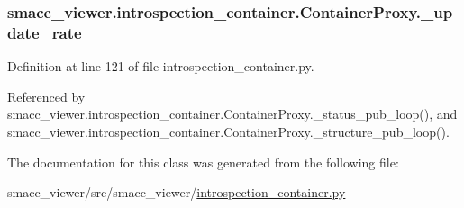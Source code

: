 \subsubsection[{\texorpdfstring{\+\_\+update\+\_\+rate}{_update_rate}}]{\setlength{\rightskip}{0pt plus 5cm}smacc\+\_\+viewer.\+introspection\+\_\+container.\+Container\+Proxy.\+\_\+update\+\_\+rate\hspace{0.3cm}{\ttfamily [private]}}\hypertarget{classsmacc__viewer_1_1introspection__container_1_1ContainerProxy_a0c5222106d95d0d78632d21873b7d2a8}{}\label{classsmacc__viewer_1_1introspection__container_1_1ContainerProxy_a0c5222106d95d0d78632d21873b7d2a8}


Definition at line 121 of file introspection\+\_\+container.\+py.



Referenced by smacc\+\_\+viewer.\+introspection\+\_\+container.\+Container\+Proxy.\+\_\+status\+\_\+pub\+\_\+loop(), and smacc\+\_\+viewer.\+introspection\+\_\+container.\+Container\+Proxy.\+\_\+structure\+\_\+pub\+\_\+loop().



The documentation for this class was generated from the following file\+:\begin{DoxyCompactItemize}
\item 
smacc\+\_\+viewer/src/smacc\+\_\+viewer/\hyperlink{introspection__container_8py}{introspection\+\_\+container.\+py}\end{DoxyCompactItemize}
